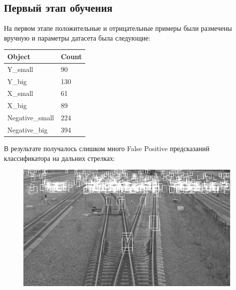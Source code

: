 \subsection{Первый этап обучения}
На первом этапе положительные и отрицательные примеры были размечены вручную и параметры датасета была следующие:
\begin{table}[h!]
	\begin{tabular}{|l|l|}
		\hline
		\textbf{Object}    & \textbf{Count} \\ \hline
		Y\_small        & 90             \\ \hline
		Y\_big          & 130            \\ \hline
		X\_small        & 61             \\ \hline
		X\_big          & 89             \\ \hline
		Negative\_small & 224            \\ \hline
		Negative\_big   & 394            \\ \hline
	\end{tabular}
\end{table}
\newline
В результате получалось слишком много False Positive предсказаний классификатора на дальних стрелках:
\begin{figure}[h!]
	\centering
	\includegraphics[width=0.7\linewidth]{pictures/screenshot32}
	\caption{}
	\label{fig:screenshot32}
\end{figure}

